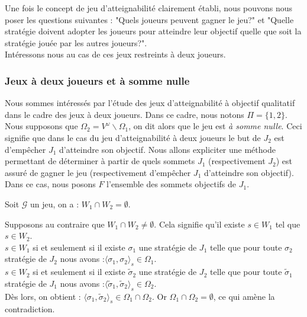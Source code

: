 	
	
	Une fois le concept de jeu d'atteignabilité clairement établi, nous pouvons nous poser les questions suivantes : "Quels joueurs peuvent gagner le jeu?" et "Quelle stratégie doivent adopter les joueurs pour atteindre leur objectif quelle que soit la stratégie jouée par les autres joueurs?". \\
	
	Intéressons nous au cas de ces jeux restreints à deux joueurs.
	
	\subsubsection{Jeux à deux joueurs et à somme nulle}
	Nous sommes intéressés par l'étude des jeux d'atteignabilité à objectif qualitatif dans le cadre des jeux à deux joueurs. Dans ce cadre, nous notons $\Pi = \{ 1,2\}$. Nous supposons que $\Omega _{2} = V^{\omega}\backslash \Omega _{1}$, on dit alors que le jeu est \textit{à somme nulle}. Ceci signifie que dans le cas du jeu d'atteignabilité à deux joueurs le but de $J_{2}$ est d'empêcher $J_{1}$ d'atteindre son objectif. Nous allons expliciter une méthode permettant de déterminer à partir de quels sommets $J_{1}$ (respectivement $J_{2}$) est assuré de gagner le jeu (respectivement d'empêcher $J_{1}$ d'atteindre son objectif). Dans ce cas, nous posons $F$ l'ensemble des sommets objectifs de $J_{1}$.
	
	\label{Wempty}
	\begin{propriete}
		Soit $\mathcal{G}$ un jeu, on a : $W_{1}\cap W_{2} = \emptyset$.
	\end{propriete}
	\begin{demonstration}
		Supposons au contraire que $W_{1}\cap W_{2} \neq \emptyset$. Cela signifie qu'il existe $s \in W_{1}$ tel que $s \in W_{2}$.\\
		$s \in W_{1}$ si et seulement si il existe $\sigma _{1}$ une stratégie de $J_{1}$ telle que pour toute $\sigma _{2}$ stratégie de $J_{2}$ nous avons :$ \langle \sigma _{1},\sigma _{2} \rangle_s \in \Omega _{1}$.\\
		$s \in W_{2}$ si et seulement si il existe $\tilde{\sigma} _{2}$ une stratégie de $J_{2}$ telle que pour toute $\tilde{\sigma}_{1}$ stratégie de $J_{1}$ nous avons :$\langle \tilde{\sigma}_{1},\tilde{\sigma}_{2} \rangle_s \in \Omega _{2}$.\\
		Dès lors, on obtient : $\langle\sigma _{1},\tilde{\sigma}_{2}\rangle_s \in \Omega _{1} \cap \Omega _{2}$. Or $\Omega _{1} \cap \Omega _{2} = \emptyset$, ce qui amène la contradiction.\\
	\end{demonstration}

